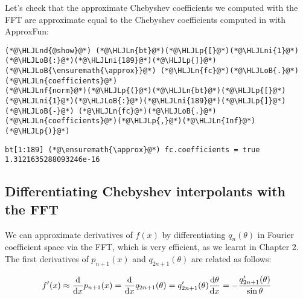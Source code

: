 \documentclass[12pt,a4paper]{article}
\newcommand{\HLJLn}[1]{#1}
\newcommand{\HLJLnd}[1]{\textcolor[RGB]{214,102,97}{#1}}
\newcommand{\HLJLnf}[1]{\textcolor[RGB]{66,102,213}{#1}}
\newcommand{\HLJLni}[1]{\textcolor[RGB]{59,151,46}{#1}}
\newcommand{\HLJLoB}[1]{\textcolor[RGB]{102,102,102}{\textbf{#1}}}
\newcommand{\HLJLp}[1]{#1}
\begin{document}
Let's check that the approximate Chebyshev coefficients we computed with the FFT are approximate equal to the Chebyshev coefficients computed in with ApproxFun:


\begin{lstlisting}
(*@\HLJLnd{@show}@*) (*@\HLJLn{bt}@*)(*@\HLJLp{[}@*)(*@\HLJLni{1}@*)(*@\HLJLoB{:}@*)(*@\HLJLni{189}@*)(*@\HLJLp{]}@*) (*@\HLJLoB{\ensuremath{\approx}}@*) (*@\HLJLn{fc}@*)(*@\HLJLoB{.}@*)(*@\HLJLn{coefficients}@*)
(*@\HLJLnf{norm}@*)(*@\HLJLp{(}@*)(*@\HLJLn{bt}@*)(*@\HLJLp{[}@*)(*@\HLJLni{1}@*)(*@\HLJLoB{:}@*)(*@\HLJLni{189}@*)(*@\HLJLp{]}@*) (*@\HLJLoB{-}@*) (*@\HLJLn{fc}@*)(*@\HLJLoB{.}@*)(*@\HLJLn{coefficients}@*)(*@\HLJLp{,}@*)(*@\HLJLn{Inf}@*)(*@\HLJLp{)}@*)
\end{lstlisting}

\begin{lstlisting}
bt[1:189] (*@\ensuremath{\approx}@*) fc.coefficients = true
1.3121635288093246e-16
\end{lstlisting}


\subsection{Differentiating Chebyshev interpolants with the FFT}
We can approximate derivatives of $f(x)$ by differentiating $q_n(\theta)$ in Fourier coefficient space via the FFT, which is very efficient, as we learnt in Chapter 2. The first derivatives of $p_{n+1}(x)$ and $q_{2n+1}(\theta)$ are related as follows:

\[
f'(x) \approx \frac{{\rm d}}{{\rm d}x}p_{n+1}(x) = \frac{{\rm d}}{{\rm d}x}q_{2n+1}(\theta) = q_{2n+1}'(\theta)\frac{{\rm d} \theta}{\mathrm{d}x} = -\frac{q_{2n+1}'(\theta)}{\sin \theta}
\]
\end{document}
